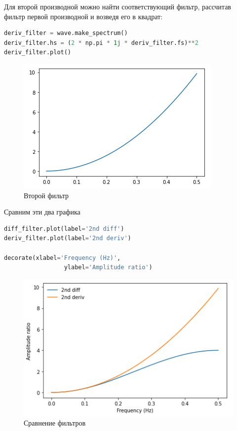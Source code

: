 Для второй производной можно найти соответствующий фильтр, рассчитав фильтр первой производной и возведя его в квадрат:

\begin{lstlisting}[language=Python]
deriv_filter = wave.make_spectrum()
deriv_filter.hs = (2 * np.pi * 1j * deriv_filter.fs)**2
deriv_filter.plot()
\end{lstlisting}

\begin{figure}[H]
	\begin{center}
		\includegraphics[scale=1]{fig/lab09/lab09_17.png}
		\caption{Второй фильтр}
	\end{center}
\end{figure}

Сравним эти два графика

\begin{lstlisting}[language=Python]
diff_filter.plot(label='2nd diff')
deriv_filter.plot(label='2nd deriv')

decorate(xlabel='Frequency (Hz)',
                 ylabel='Amplitude ratio')
\end{lstlisting}

\begin{figure}[H]
	\begin{center}
		\includegraphics[scale=1]{fig/lab09/lab09_18.png}
		\caption{Сравнение фильтров}
	\end{center}
\end{figure}

